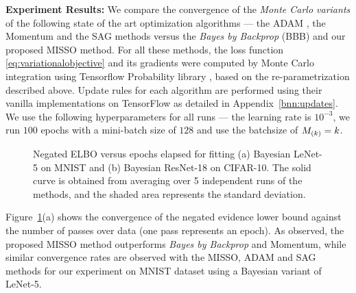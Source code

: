 \documentclass[11pt]{article}
\theoremstyle{t}
\begin{document}
\textbf{Experiment Results:}
We compare the convergence of the \textit{Monte Carlo variants} of the following state of the art optimization algorithms --- the ADAM \citep{kingma:adam}, the Momentum \citep{sutskever2013importance} and the SAG \citep{schmidt2017minimizing} methods versus the \textit{Bayes by Backprop} (BBB) \citep{blundell2015weight} and our proposed MISSO method.
For all these methods, the loss function \eqref{eq:variationalobjective} and its gradients were computed by Monte Carlo integration using Tensorflow Probability library \citep{dillon2017tfp}, based on the re-parametrization described above.
Update rules for each algorithm are performed using their vanilla implementations on TensorFlow \citep{tensorflow2015-whitepaper} as detailed in Appendix~\ref{bnn:updates}.
We use the following hyperparameters for all runs --- the learning rate is $10^{-3}$, we run $100$ epochs with a mini-batch size of $128$ and use the batchsize of $\Bsize{k} = k$.\vspace{-.2cm}
\vspace{-.3cm}
\begin{figure}[H]
    \centering
    \qquad
  \caption{Negated ELBO versus epochs elapsed for fitting (a) Bayesian LeNet-5 on MNIST and (b) Bayesian ResNet-18 on CIFAR-10. The solid curve is obtained from averaging over 5 independent runs of the methods, and the shaded area represents the standard deviation.}\label{fig:lenetopt}
\end{figure}
\vspace{-.3cm}
Figure~\ref{fig:lenetopt}(a) shows the convergence of the negated evidence lower bound against the number of passes over data (one pass represents an epoch). As observed, the proposed MISSO method outperforms \textit{Bayes by Backprop} and Momentum, while similar convergence rates are observed with the MISSO, ADAM and SAG methods for our experiment on MNIST dataset using a Bayesian variant of LeNet-5. 
\end{document}
